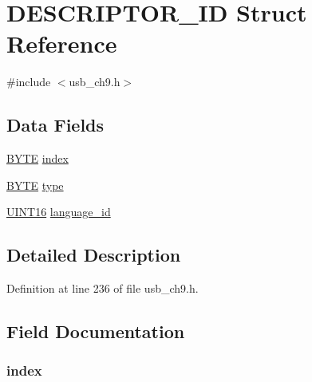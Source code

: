 \hypertarget{struct_d_e_s_c_r_i_p_t_o_r___i_d}{}\section{D\+E\+S\+C\+R\+I\+P\+T\+O\+R\+\_\+\+I\+D Struct Reference}
\label{struct_d_e_s_c_r_i_p_t_o_r___i_d}


{\ttfamily \#include $<$usb\+\_\+ch9.\+h$>$}

\subsection*{Data Fields}
\begin{DoxyCompactItemize}
\item 
\hyperlink{_generic_type_defs_8h_a4ae1dab0fb4b072a66584546209e7d58}{B\+Y\+T\+E} \hyperlink{struct_d_e_s_c_r_i_p_t_o_r___i_d_a3e47fb8bc59d325b33374d8f2ab1997d}{index}
\item 
\hyperlink{_generic_type_defs_8h_a4ae1dab0fb4b072a66584546209e7d58}{B\+Y\+T\+E} \hyperlink{struct_d_e_s_c_r_i_p_t_o_r___i_d_aab7cf12125f16245546ef7411994ebb9}{type}
\item 
\hyperlink{_generic_type_defs_8h_acfa284fa8026c4aace2728f7f15d6c13}{U\+I\+N\+T16} \hyperlink{struct_d_e_s_c_r_i_p_t_o_r___i_d_a0eb9c920ac13d369be35897e9765dab1}{language\+\_\+id}
\end{DoxyCompactItemize}


\subsection{Detailed Description}


Definition at line 236 of file usb\+\_\+ch9.\+h.



\subsection{Field Documentation}
\hypertarget{struct_d_e_s_c_r_i_p_t_o_r___i_d_a3e47fb8bc59d325b33374d8f2ab1997d}{}
\subsubsection[{index}]{ index}\label{struct_d_e_s_c_r_i_p_t_o_r___i_d_a3e47fb8bc59d325b33374d8f2ab1997d}


